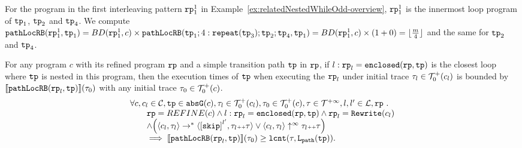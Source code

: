   For the program in the first interleaving pattern $\mathtt{rp}_1^1$ in Example~\ref{ex:relatedNestedWhileOdd-overview}, $\mathtt{rp}_1^1$ is the innermost loop program of $\mathtt{tp}_1$, $\mathtt{tp}_2$ and $\mathtt{tp}_4$.
  We compute $\mathtt{pathLocRB}(\mathtt{rp}_1^1, \mathtt{tp}_1) = BD(\mathtt{rp}_1^1, c) \times \mathtt{pathLocRB}(\mathtt{tp}_1; 4:\mathtt{repeat}(\mathtt{tp}_3); \mathtt{tp}_2; \mathtt{tp}_4, \mathtt{tp}_1)
  = BD(\mathtt{rp}_1^1, c) \times (1 + 0) = \lfloor \frac{m}{4} \rfloor $ and the same for $\mathtt{tp}_2$ and $\mathtt{tp}_4$.
\begin{lem}
  \label{lem:pathlocalrb-sound}
  For any program $c$ with its refined program $\mathtt{rp}$ and a simple transition path $\mathtt{tp}$ in $\mathtt{rp}$,
  if $l: \mathtt{rp}_l = \mathtt{enclosed}(\mathtt{rp}, \mathtt{tp})$ is the closest loop where $\mathtt{tp}$ is nested in this program,
  then the execution times of $\mathtt{tp}$ when executing the $\mathtt{rp}_l$ under initial trace $\mathtt{\tau}_l \in \mathcal{T}^{+}_0(c_l)$ is bounded by $\llbracket \mathtt{pathLocRB}(\mathtt{rp}_l, \mathtt{tp}) \rrbracket(\mathtt{\tau}_0)$ with any initial trace $\mathtt{\tau}_0 \in \mathcal{T}^{+}_0(c)$.
  {\small
  \[
    \begin{array}{l}
    \forall c, c_l \in \cdom, \tpath \in \absG(c), 
    \trace_l \in \ftdom_0(c_l), \trace_0 \in \ftdom_0(c), \trace \in \tdom, l, l' \in \ldom, \rprog \st 
    \\ \qquad
    \rprog = REFINE(c)
    \land
    l: \rprog_l = \kw{enclosed}(\rprog, \tpath)
    \land 
    \rprog_l = \algrewrite(c_l)
    \\ \qquad
    \land
    \Big(
    \config{c_l, \trace_l} \rightarrow^* \config{\clabel{\eskip}^{l'}, \trace_l \tracecat \trace}
    \lor \config{c_l, \trace_l} \uparrow^{\infty} \trace_l \tracecat \trace 
    \Big)
    \\ \qquad
    \implies
    \econfig{\outinB(\rprog_l, \tpath)}(\trace_0) \geq \lcounter(\trace, \pathl(\tpath)).
    \end{array}
  \]  
  }
\end{lem}


